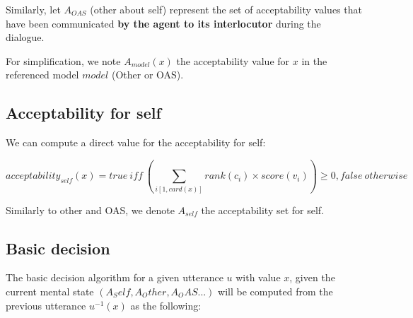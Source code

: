 \documentclass{llncs}
\begin{document}
Similarly, let $A_{OAS}$ (other about self) represent the set of acceptability values that have been communicated \textbf{by the agent to its interlocutor} during the dialogue.

For simplification, we note $A_{model}(x)$ the acceptability value for $x$ in the referenced model $model$ (Other or OAS).

\subsection{Acceptability for self}

We can compute a direct value for the acceptability for self:

$$acceptability_{self}(x) = true\ iff\ \left(\sum_{i[1,card(x)]} rank(c_i)\times score(v_i)\right)\geq0, false\ otherwise$$

Similarly to other and OAS, we denote $A_{self}$ the acceptability set for self.

\subsection{Basic decision}

The basic decision algorithm for a given utterance $u$ with value $x$, given the current mental state $(A_Self,A_Other,A_OAS...)$ will be computed from the previous utterance $u ^{-1}(x)$ as the following:
\end{document}
